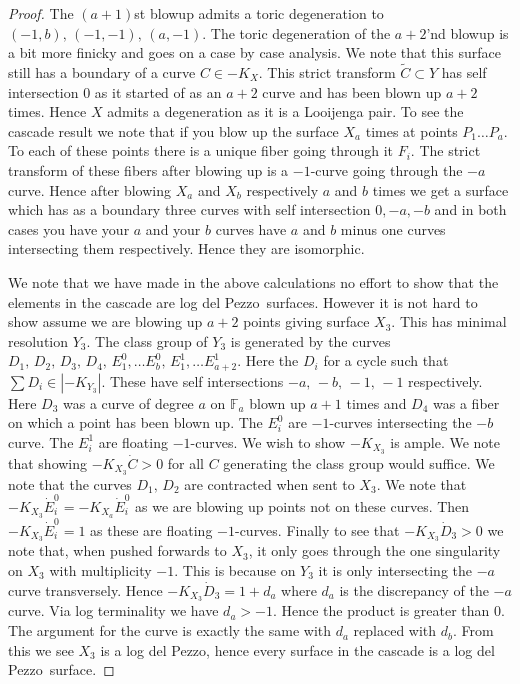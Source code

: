 \documentclass[11pt]{amsbook}
\theoremstyle{definition}
\theoremstyle{definition}
\theoremstyle{definition}
\theoremstyle{definition}
\theoremstyle{definition}
\theoremstyle{definition}
\theoremstyle{definition}
\theoremstyle{definition}
\newcommand{\ldp}{log del Pezzo}
\newcommand{\mb}[1]{\mathbb{#1}}
\newcommand{\LJ}{Looijenga pair}
\newcommand{\wt}[1]{\widetilde #1}
\begin{document}
\begin{proof}
 The $(a+1)$st blowup admits a toric degeneration to $(-1, b), \, (-1, -1), \, (a, -1)$. The toric degeneration of the $a+2$'nd blowup is a bit more finicky and goes on a case by case analysis. We note that this surface still has a boundary of a curve  $C \in -K_X$. This strict transform $\wt{C} \subset Y$ has self intersection $0$ as it started of as an $a+2$ curve and has been blown up $a+2$ times. Hence $X$ admits a degeneration as it is a \LJ. To see the cascade result we note that if you blow up the surface $X_a$ times at points $P_1 \dots P_a$. To each of these points there is a unique fiber going through it $F_i$. The strict transform of these fibers after blowing up is a $-1$-curve going through the $-a$ curve. Hence after blowing $X_a$ and $X_b$ respectively $a$ and $b$ times we get a surface which has as a boundary three curves with self intersection $0, -a, -b$ and in both cases you have your $a$ and your $b$ curves have $a$ and $b$ minus one curves intersecting them respectively. Hence they are isomorphic. 
 
 
 We note that we have made in the above calculations no effort to show that the elements in the cascade are \ldp\ surfaces. However it is not hard to show assume we are blowing up $a+2$ points giving surface $X_3$. This has minimal resolution $Y_3$. The class group of $Y_3$ is generated by the curves $D_1, \, D_2, \, D_3, \, D_4, \, E_1^0, \dots E_b^0, \, E_1^1, \dots E_{a+2}^1$. Here the $D_i$ for a cycle such that $\sum D_i \in |-K_{Y_3}|$. These have self intersections $-a, \, -b, \, -1, \, -1$ respectively. Here $D_3$ was a curve of degree $a$  on $\mb{F}_a$ blown up $a+1$ times and $D_4$ was a fiber on which a point has been blown up. The $E_i^0$ are $-1$-curves intersecting the $-b$ curve. The $E_i^1$ are floating $-1$-curves. We wish to show $-K_{X_3}$ is ample. We note that showing $-K_{X_3} \dot C > 0$ for all $C$ generating the class group would suffice. We note that the curves $D_1, \, D_2$ are contracted when sent to $X_3$. We note that $-K_{X_3} \dot E_i^0 = -K_{X_a} \dot E_i^0$ as we are blowing up points not on these curves. Then $-K_{X_3} \dot E_i^0 = 1$ as these are floating $-1$-curves. Finally to see that $-K_{X_3} \dot D_3 > 0$ we note that, when pushed forwards to $X_3$, it only goes through the one singularity on $X_3$ with multiplicity $-1$. This is because on $Y_3$ it is only intersecting the $-a$ curve transversely. Hence $-K_{X_3} \dot D_3 = 1 + d_a$ where $d_a$ is the discrepancy of the $-a$ curve. Via log terminality we have $d_a > -1$. Hence the product is greater than 0. The argument for the curve is exactly the same with $d_a$ replaced with $d_b$. From this we see $X_3$ is a \ldp, hence every surface in the cascade is a \ldp\ surface.
\end{proof}
\end{document}
